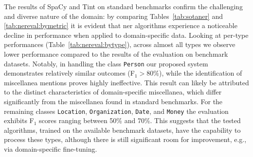 The results of SpaCy and Tint on standard benchmarks confirm the challenging and diverse nature of the domain: by comparing Tables~\ref{tab:sotaner} and \ref{tab:nereval:bymetric} it is evident that 
\ac{ner} algorithms experience a noticeable decline in performance when applied to domain-specific data.
Looking at per-type performances (Table~\ref{tab:nereval:bytype}), across almost all types we observe lower performance compared to the results of the evaluation on benchmark datasets. Notably, in handling the class \texttt{Person} our proposed system demonstrates relatively similar outcomes (F$_1 > 80\%$), while the identification of miscellanea mentions proves highly ineffective. This result can likely be attributed to the distinct characteristics of domain-specific miscellanea, which differ significantly from the miscellanea found in standard benchmarks.
For the remaining classes \texttt{Location}, \texttt{Organization}, \texttt{Date}, and \texttt{Money} the evaluation exhibits F$_1$ scores ranging between 50\% and 70\%. This suggests that the tested algorithms, trained on the available benchmark datasets, have the capability to process these types, although there is still significant room for improvement, e.g., via domain-specific fine-tuning.




